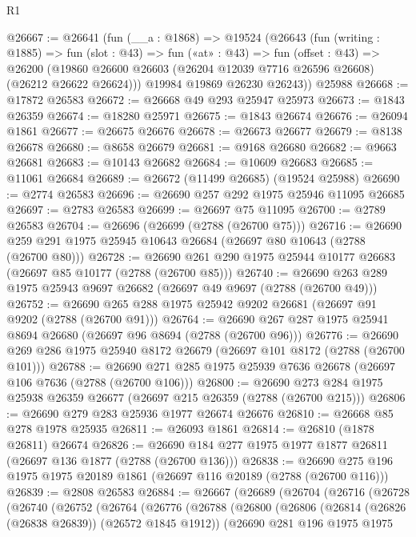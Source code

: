 \begin{lexlean}{R1}
\begin{coremodule}
@26667 := @26641
    (fun (__a : @1868) =>
    @19524
      (@26643
        (fun (writing : @1885) =>
        fun (slot : @43) =>
        fun («at» : @43) =>
        fun (offset : @43) =>
        @26200 (@19860 @26600 @26603 (@26204 @12039 @7716 @26596 @26608) (@26212 @26622 @26624)))
        @19984
        @19869
        @26230
        @26243))
    @25988
@26668 := @17872 @26583
@26672 := @26668 @49 @293 @25947 @25973
@26673 := @1843 @26359
@26674 := @18280 @25971
@26675 := @1843 @26674
@26676 := @26094 @1861
@26677 := @26675 @26676
@26678 := @26673 @26677
@26679 := @8138 @26678
@26680 := @8658 @26679
@26681 := @9168 @26680
@26682 := @9663 @26681
@26683 := @10143 @26682
@26684 := @10609 @26683
@26685 := @11061 @26684
@26689 := @26672 (@11499 @26685) (@19524 @25988)
@26690 := @2774 @26583
@26696 := @26690 @257 @292 @1975 @25946 @11095 @26685
@26697 := @2783 @26583
@26699 := @26697 @75 @11095
@26700 := @2789 @26583
@26704 := @26696 (@26699 (@2788 (@26700 @75)))
@26716 := @26690 @259 @291 @1975 @25945 @10643 @26684 (@26697 @80 @10643 (@2788 (@26700 @80)))
@26728 := @26690 @261 @290 @1975 @25944 @10177 @26683 (@26697 @85 @10177 (@2788 (@26700 @85)))
@26740 := @26690 @263 @289 @1975 @25943 @9697 @26682 (@26697 @49 @9697 (@2788 (@26700 @49)))
@26752 := @26690 @265 @288 @1975 @25942 @9202 @26681 (@26697 @91 @9202 (@2788 (@26700 @91)))
@26764 := @26690 @267 @287 @1975 @25941 @8694 @26680 (@26697 @96 @8694 (@2788 (@26700 @96)))
@26776 := @26690 @269 @286 @1975 @25940 @8172 @26679 (@26697 @101 @8172 (@2788 (@26700 @101)))
@26788 := @26690 @271 @285 @1975 @25939 @7636 @26678 (@26697 @106 @7636 (@2788 (@26700 @106)))
@26800 := @26690 @273 @284 @1975 @25938 @26359 @26677 (@26697 @215 @26359 (@2788 (@26700 @215)))
@26806 := @26690 @279 @283 @25936 @1977 @26674 @26676
@26810 := @26668 @85 @278 @1978 @25935
@26811 := @26093 @1861
@26814 := @26810 (@1878 @26811) @26674
@26826 := @26690 @184 @277 @1975 @1977 @1877 @26811 (@26697 @136 @1877 (@2788 (@26700 @136)))
@26838 := @26690 @275 @196 @1975 @1975 @20189 @1861 (@26697 @116 @20189 (@2788 (@26700 @116)))
@26839 := @2808 @26583
@26884 := @26667
    (@26689
      (@26704
        (@26716
          (@26728
            (@26740
              (@26752
                (@26764
                  (@26776
                    (@26788
                      (@26800
                        (@26806
                          (@26814 (@26826 (@26838 @26839)) (@26572 @1845 @1912))
                          (@26690
                            @281
                            @196
                            @1975
                            @1975

\end{coremodule}
\end{lexlean}
